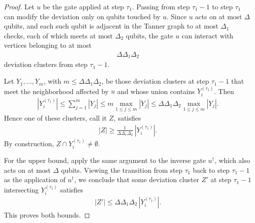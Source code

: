 \begin{proof}
  Let $u$ be the gate applied at step $\tau_{1}$. Passing from step $\tau_{1}-1$ to step $\tau_{1}$ can modify the deviation only on qubits touched by $u$. Since $u$ acts on at most $\Delta$ qubits, and each such qubit is adjacent in the Tanner graph to at most $\Delta_{1}$ checks, each of which meets at most $\Delta_{2}$ qubits, the gate $u$ can interact with vertices belonging to at most
  \begin{equation*}
    \begin{split}
      \Delta\Delta_{1}\Delta_{2}
    \end{split}
  \end{equation*}
  deviation clusters from step $\tau_{1}-1$.

  Let $Y_{1},\ldots,Y_{m}$, with $m\le \Delta\Delta_{1}\Delta_{2}$, be those deviation clusters at step $\tau_{1}-1$ that meet the neighborhood affected by $u$ and whose union contains $Y_i^{(\tau_{1})}$. Then
  \begin{equation*}
    \begin{split}
      |Y_i^{(\tau_{1})}| \le \sum_{j=1}^{m}|Y_j| \le m\max_{1\le j\le m}|Y_j| \le \Delta\Delta_{1}\Delta_{2}\max_{1\le j\le m}|Y_j|.
    \end{split}
  \end{equation*}
  Hence one of these clusters, call it $Z$, satisfies
  \begin{equation*}
    \begin{split}
      |Z| \ge \frac{1}{\Delta\Delta_{1}\Delta_{2}}\,|Y_i^{(\tau_{1})}|.
    \end{split}
  \end{equation*}
  By construction, $Z\cap Y_i^{(\tau_{1})}\neq \emptyset$.

  For the upper bound, apply the same argument to the inverse gate $u^{\dagger}$, which also acts on at most $\Delta$ qubits. Viewing the transition from step $\tau_{1}$ back to step $\tau_{1}-1$ as the application of $u^{\dagger}$, we conclude that some deviation cluster $Z'$ at step $\tau_{1}-1$ intersecting $Y_i^{(\tau_{1})}$ satisfies
  \begin{equation*}
    \begin{split}
      |Z'| \le \Delta\Delta_{1}\Delta_{2}\,|Y_i^{(\tau_{1})}|.
    \end{split}
  \end{equation*}
  This proves both bounds.
\end{proof}


